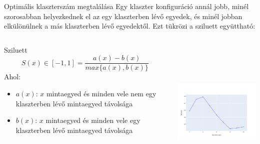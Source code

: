 \documentclass[english, aspectratio=169]{beamer}
\begin{document}
\begin{frame}[fragile]{Optimális klaszterszám megtalálása}
	Egy klaszter konfiguráció annál jobb, minél szorosabban helyezkednek el az egy klaszterben lévő egyedek, és minél jobban elkülönülnek a más klaszterben lévő egyedektől. Ezt tükrözi a sziluett együttható:
	\begin{columns}
		\begin{column}{.5\textwidth}
			\begin{block}{Sziluett}
				\[
				S(x) \in \left[ -1, 1 \right]= \frac{a(x) - b(x)}{max\{ a(x), b(x)\}}
				\]
				Ahol:
				\begin{itemize}
					\item $a(x)$: $x$ mintaegyed és minden vele nem egy klaszterben lévő mintaegyed távolsága
					\item $b(x)$: $x$ mintaegyed és minden vele egy klaszterben lévő mintaegyed távolsága
				\end{itemize}
			\end{block}
		\end{column}
		\begin{column}{.5\textwidth}
			\begin{center}
				\includegraphics[width=7cm, height=7cm, keepaspectratio]{images/freq_15.png}
			\end{center}
		\end{column}
	\end{columns}
\end{frame}
\end{document}
